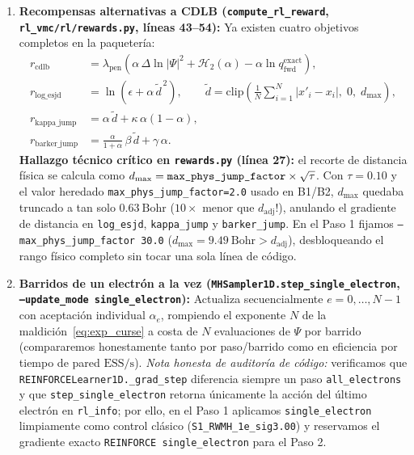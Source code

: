 \documentclass[10pt,a4paper]{article}
\begin{document}
\begin{enumerate}
Elimina la deriva de Langevin impuesta $\tau\bm{F}_Q$ de \texttt{residual\_mala}, dejando que el actor controle directamente la media $\bm{\mu}(\bm{X}) = \bm{X} + A_{\mathrm{actor}}\bm{a}_\mu(\bm{X}, \bm{F}_Q)$ mientras conserva $\bm{F}_Q$ como característica de entrada (reescalada con \texttt{--force\_scale 1.0} en lugar de $5.0$ para restaurar $5\times$ la amplitud de señal dentro de los pozos).
\item \textbf{Recompensas alternativas a CDLB (\texttt{compute\_rl\_reward}, \texttt{rl\_vmc/rl/rewards.py}, líneas 43--54):}
Ya existen cuatro objetivos completos en la paquetería:
\begin{align}
r_{\mathrm{cdlb}} &= \lambda_{\mathrm{pen}}\!\left(\alpha\,\Delta\ln|\Psi|^2 + \mathcal{H}_2(\alpha) - \alpha\ln q_{\mathrm{fwd}}^{\mathrm{exact}}\right), \label{eq:r_cdlb}\\
r_{\mathrm{log\_esjd}} &= \ln\!\left(\epsilon + \alpha\,\tilde{d}^{\,2}\right), \qquad \tilde{d} = \mathrm{clip}\!\left(\frac{1}{N}\sum_{i=1}^N |x'_i - x_i|,\; 0,\; d_{\max}\right), \label{eq:r_logesjd}\\
r_{\mathrm{kappa\_jump}} &= \alpha\,\tilde{d} + \kappa\,\alpha(1 - \alpha), \label{eq:r_kappa}\\
r_{\mathrm{barker\_jump}} &= \frac{\alpha}{1+\alpha}\,\beta\,\tilde{d} + \gamma\,\alpha. \label{eq:r_barker}
\end{align}
\textbf{Hallazgo técnico crítico en \texttt{rewards.py} (línea 27):} el recorte de distancia física se calcula como $d_{\max} = \text{\texttt{max\_phys\_jump\_factor}} \times \sqrt{\tau}$. Con $\tau = 0.10$ y el valor heredado \texttt{max\_phys\_jump\_factor=2.0} usado en B1/B2, $d_{\max}$ quedaba truncado a tan solo $0.63\ \mathrm{Bohr}$ ($10\times$ menor que $d_{\mathrm{adj}}$!), anulando el gradiente de distancia en \texttt{log\_esjd}, \texttt{kappa\_jump} y \texttt{barker\_jump}. En el Paso 1 fijamos \texttt{--max\_phys\_jump\_factor 30.0} ($d_{\max} = 9.49\ \mathrm{Bohr} > d_{\mathrm{adj}}$), desbloqueando el rango físico completo sin tocar una sola línea de código.
\item \textbf{Barridos de un electrón a la vez (\texttt{MHSampler1D.step\_single\_electron}, \texttt{--update\_mode single\_electron}):}
Actualiza secuencialmente $e = 0, \dots, N-1$ con aceptación individual $\alpha_e$, rompiendo el exponente $N$ de la maldición~\eqref{eq:exp_curse} a costa de $N$ evaluaciones de $\Psi$ por barrido (compararemos honestamente tanto por paso/barrido como en eficiencia por tiempo de pared $\mathrm{ESS/s}$). \textit{Nota honesta de auditoría de código:} verificamos que \texttt{REINFORCELearner1D.\_grad\_step} diferencia siempre un paso \texttt{all\_electrons} y que \texttt{step\_single\_electron} retorna únicamente la acción del último electrón en \texttt{rl\_info}; por ello, en el Paso 1 aplicamos \texttt{single\_electron} limpiamente como control clásico (\texttt{S1\_RWMH\_1e\_sig3.00}) y reservamos el gradiente exacto \texttt{REINFORCE single\_electron} para el Paso 2.

\end{enumerate}
\end{document}
